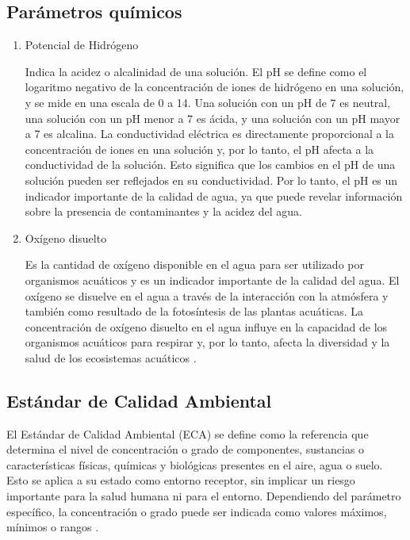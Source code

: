 \subsection{Parámetros químicos}
\begin{enumerate}[label=\alph*)]
    \item Potencial de Hidrógeno
    
Indica la acidez o alcalinidad de una solución. El pH se define como el logaritmo negativo de la concentración de iones de hidrógeno en una solución, y se mide en una escala de 0 a 14. Una solución con un pH de 7 es neutral, una solución con un pH menor a 7 es ácida, y una solución con un pH mayor a 7 es alcalina. La conductividad eléctrica es directamente proporcional a la concentración de iones en una solución y, por lo tanto, el pH afecta a la conductividad de la solución. Esto significa que los cambios en el pH de una solución pueden ser reflejados en su conductividad. Por lo tanto, el pH es un indicador importante de la calidad de agua, ya que puede revelar información sobre la presencia de contaminantes y la acidez del agua.

\item Oxígeno disuelto

Es la cantidad de oxígeno disponible en el agua para ser utilizado por organismos acuáticos y es un indicador importante de la calidad del agua. El oxígeno se disuelve en el agua a través de la interacción con la atmósfera y también como resultado de la fotosíntesis de las plantas acuáticas. La concentración de oxígeno disuelto en el agua influye en la capacidad de los organismos acuáticos para respirar y, por lo tanto, afecta la diversidad y la salud de los ecosistemas acuáticos \cite{americam}.
\end{enumerate}
\subsection{ Estándar de Calidad Ambiental}

El Estándar de Calidad Ambiental (ECA) se define como la referencia que determina el nivel de concentración o grado de componentes, sustancias o características físicas, químicas y biológicas presentes en el aire, agua o suelo. Esto se aplica a su estado como entorno receptor, sin implicar un riesgo importante para la salud humana ni para el entorno. Dependiendo del parámetro específico, la concentración o grado puede ser indicada como valores máximos, mínimos o rangos \cite{minam2005}.

